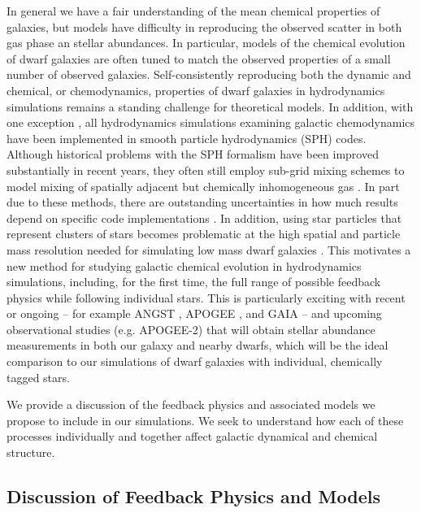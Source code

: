 \documentclass[11pt]{article}
\newcommand{\eg}{e.g.,}
\begin{document}
In general we have a fair understanding of the mean chemical properties of galaxies, but models have difficulty in reproducing the observed scatter in both gas phase an stellar abundances. In particular, models of the chemical evolution of dwarf galaxies are often tuned to match the observed properties of a small number of observed galaxies. Self-consistently reproducing both the dynamic and chemical, or chemodynamics, properties of dwarf galaxies in hydrodynamics simulations remains a standing challenge for theoretical models. In addition, with one exception \citep{Few2012, Few2014}, all hydrodynamics simulations examining galactic chemodynamics have been implemented in smooth particle hydrodynamics (SPH) codes. Although historical problems with the SPH formalism have been improved substantially in recent years, they often still employ sub-grid mixing schemes to model mixing of spatially adjacent but chemically inhomogeneous gas \citep[\eg][]{ShenWadsleyStinson2010}. In part due to these methods, there are outstanding uncertainties in how much results depend on specific code implementations \citep{Revaz2016}. In addition, using star particles that represent clusters of stars becomes problematic at the high spatial and particle mass resolution needed for simulating low mass dwarf galaxies \citep{Revaz2016}. This motivates a new method for studying galactic chemical evolution in hydrodynamics simulations, including, for the first time, the full range of possible feedback physics while following individual stars. This is particularly exciting with recent or ongoing -- for example ANGST \citep{ANGST2009}, APOGEE \citep{APOGEE2010}, and GAIA -- and upcoming observational studies (e.g. APOGEE-2) that will obtain stellar abundance measurements in both our galaxy and nearby dwarfs, which will be the ideal comparison to our simulations of dwarf galaxies with individual, chemically tagged stars.

We provide a discussion of the feedback physics and associated models we propose to include in our simulations. We seek to understand how each of these processes individually and together affect galactic dynamical and chemical structure. 

\subsection{Discussion of Feedback Physics and Models}
\end{document}
